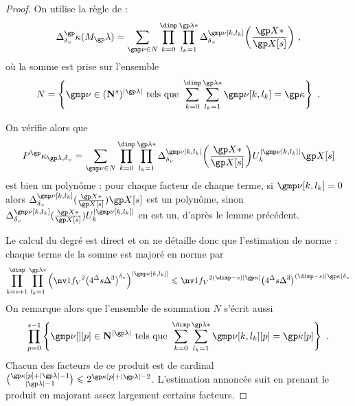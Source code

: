 \begin{proof}
  \newcommand \indl {{ \gmp\nu[\ind, \indi_\ind] }}
  On utilise la règle de  :
  \begin{equation}
    \pdiff^\derp(M_\ip) =
    \sum_{\gmp\nu \in N}
    \prod\indrange
    \prod_{ \indi_\ind = 1 }^{ \ip* }
    \pdiff^\indl \biggl( \frac{ \vp* }{ \vp[\anydim] } \biggr)
    \pmm,
  \end{equation}
  où la somme est prise sur l'ensemble
  \begin{equation}
    N = \left\{
      \gmp\nu \in (\N^\anydim)^{\lgr\ip}
      \text{ tels que }
      \sum\indrange \sum_{\indi_\ind = 1}^{\ip*} \indl = \derp
    \right\}
    \pmm.
  \end{equation}

  On vérifie alors que
  \begin{equation}
    P^\derp_{\ip, \dv}
    =
    \sum_{\gmp\nu \in N}
    \prod\indrange
    \prod_{ \indi_\ind = 1 }^{ \ip* }
    \pdiff^\indl \biggl( \frac{ \vp* }{ \vp[\anydim] } \biggr)
    \pden_\ind^{\lgr\indl}
    \vp[\anydim]
  \end{equation}
  est bien un polynôme : pour chaque facteur de chaque terme, si \( \indl = 0
  \) alors \(
    \pdiff^\indl ( \frac{ \vp* }{ \vp[\anydim] } )
    \vp[\anydim]
  \) est un polynôme, sinon \(
    \pdiff^\indl ( \frac{ \vp* }{ \vp[\anydim] } )
    \pden_\ind^{\lgr\indl}
  \) en est un, d'après le lemme précédent.

  Le calcul du degré est direct et on ne détaille donc que l'estimation de
  norme : chaque terme de la somme est majoré en norme par
  \begin{align}
    \prod_{\ind = \anydim + 1}^{\dimp}
    \prod_{ \indi_\ind = 1 }^{ \ip* }
    \left(
      \nv1{ \chow\anyvar }^2
      \bigl( 4^\anydeg \anydim \anydeg^{3} \bigr)^\dv
    \right)^{\lgr\indl}
    \le
    \nv1{ \chow\anyvar }^{2 (\dimp - \anydim) \lgr\derp}
    \bigl( 4^\anydeg \anydim \anydeg^{3} \bigr)
    ^{(\dimp - \anydim) \lgr\derp \dv}
  \end{align}
  On remarque alors que l'ensemble de sommation \( N \) s'écrit aussi
  \begin{equation}
    \prod_{p = 0}^{\anydim - 1} \left\{
      \gmp\nu[][p] \in \N^{\lgr\ip}
      \text{ tels que }
      \sum\indrange \sum_{\indi_\ind = 1}^{\ip*}
      \gmp\nu[\ind, \indi_\ind][p]
      = \derp[p]
    \right\}
    \pmm.
  \end{equation}
  Chacun des facteurs de ce produit est de cardinal
  \(
    \binom{ \derp[p] + \lgr\ip - 1 }{ \lgr\ip - 1 }
    \le
    2^{ \derp[p] + \lgr\ip - 2 }
  \).
  L'estimation annoncée suit en prenant le produit en majorant assez largement
  certains facteurs.


\end{proof}
